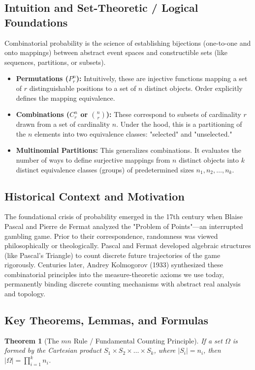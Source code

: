 \documentclass[11pt]{article}
\theoremstyle{definition}
\theoremstyle{plain}
\newtheorem{theorem}{Theorem}[section]
\theoremstyle{remark}
\newcommand{\sample}{\Omega}
\begin{document}
\subsection{Intuition and Set-Theoretic / Logical Foundations}
Combinatorial probability is the science of establishing bijections (one-to-one and onto mappings) between abstract event spaces and constructible sets (like sequences, partitions, or subsets). 
\begin{itemize}
    \item \textbf{Permutations ($P^n_r$):} Intuitively, these are injective functions mapping a set of $r$ distinguishable positions to a set of $n$ distinct objects. Order explicitly defines the mapping equivalence.
    \item \textbf{Combinations ($C^n_r$ or $\binom{n}{r}$):} These correspond to subsets of cardinality $r$ drawn from a set of cardinality $n$. Under the hood, this is a partitioning of the $n$ elements into two equivalence classes: "selected" and "unselected."
    \item \textbf{Multinomial Partitions:} This generalizes combinations. It evaluates the number of ways to define surjective mappings from $n$ distinct objects into $k$ distinct equivalence classes (groups) of predetermined sizes $n_1, n_2, \dots, n_k$.
\end{itemize}

\subsection{Historical Context and Motivation}
The foundational crisis of probability emerged in the 17th century when Blaise Pascal and Pierre de Fermat analyzed the "Problem of Points"—an interrupted gambling game. Prior to their correspondence, randomness was viewed philosophically or theologically. Pascal and Fermat developed algebraic structures (like Pascal's Triangle) to count discrete future trajectories of the game rigorously. Centuries later, Andrey Kolmogorov (1933) synthesized these combinatorial principles into the measure-theoretic axioms we use today, permanently binding discrete counting mechanisms with abstract real analysis and topology.

\subsection{Key Theorems, Lemmas, and Formulas}
\begin{theorem}[The $mn$ Rule / Fundamental Counting Principle]
If a set $\sample$ is formed by the Cartesian product $S_1 \times S_2 \times \dots \times S_k$, where $|S_i| = n_i$, then $|\sample| = \prod_{i=1}^k n_i$.
\end{theorem}
\end{document}

